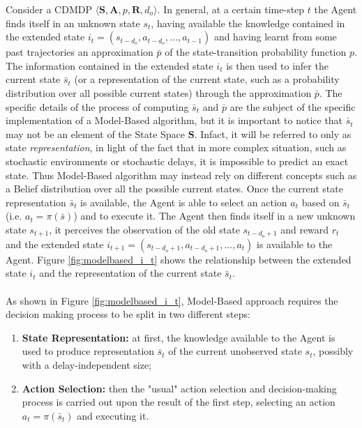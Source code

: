                 Consider a CDMDP $\langle \mathbf{S}, \mathbf{A}, p, \mathbf{R}, d_o\rangle$. In general, at a certain time-step $t$ the Agent finds itself in an unknown state $s_t$, having available the knowledge contained in the extended state $i_t = \left( s_{t-d_{o}}, a_{t-d_{o}}, ..., a_{t-1}\right)$ and having learnt from some past trajectories an approximation $\bar{p}$ of the state-transition probability function $p$. The information contained in the extended state $i_t$ is then used to infer the current state $\bar{s}_t$ (or a representation of the current state, such as a probability distribution over all possible current states) through the approximation $\bar{p}$. The specific details of the process of computing $\bar{s}_t$ and $\bar{p}$ are the subject of the specific implementation of a Model-Based algorithm, but it is important to notice that $\bar{s}_t$ may not be an element of the State Space $\mathbf{S}$. Infact, it will be referred to only as state \textit{representation}, in light of the fact that in more complex situation, such as stochastic environments or stochastic delays, it is impossible to predict an exact state. Thus Model-Based algorithm may instead rely on different concepts such as a Belief distribution over all the possible current states. Once the current state representation $\bar{s}_t$ is available, the Agent is able to select an action $a_t$ based on $\bar{s}_t$ (i.e. $a_t = \pi\left(\bar{s}\right)$) and to execute it. The Agent then finds itself in a new unknown state $s_{t+1}$, it perceives the observation of the old state $s_{t-d_{o}+1}$ and reward $r_t$ and the extended state $i_{t+1} = \left( s_{t-d_{o}+1}, a_{t-d_{o}+1}, ..., a_{t}\right)$ is available to the Agent. Figure \ref{fig:modelbased_i_t} shows the relationship between the extended state $i_t$ and the representation of the current state $\bar{s}_t$.
                \\\\
                As shown in Figure \ref{fig:modelbased_i_t}, Model-Based approach requires the decision making process to be split in two different steps:
                \begin{enumerate}
                    \item\textbf{State Representation:} at first, the knowledge available to the Agent is used to produce representation $\bar{s}_t$ of the current unobserved state $s_t$, possibly with a delay-independent size; 
                    \item\textbf{Action Selection:} then the "usual" action selection and decision-making process is carried out upon the result of the first step, selecting an action $a_t = \pi(\bar{s}_t)$ and executing it.
                \end{enumerate}
